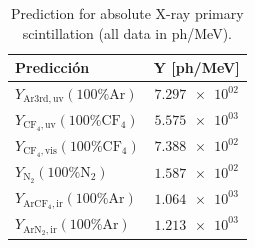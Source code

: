 \begin{table}
\caption{Prediction for absolute X-ray primary scintillation (all data in ph/MeV).}
\label{tab:prediction}
\begin{tabular}{lS}
\toprule
{Predicción} & {Y [ph/MeV]} \\
\midrule
$Y_{\mathrm{Ar3rd,uv}} (100\% \mathrm{Ar})$ & $\num{7.297e+02}$ \\
$Y_{\mathrm{CF_4,uv}} (100\% \mathrm{CF_4})$ & $\num{5.575e+03}$ \\
$Y_{\mathrm{CF_4,vis}} (100\% \mathrm{CF_4})$ & $\num{7.388e+02}$ \\
$Y_{\mathrm{N_2}} (100\% \mathrm{N_2})$ & $\num{1.587e+02}$ \\
$Y_{\mathrm{ArCF_4,ir}} (100\% \mathrm{Ar})$ & $\num{1.064e+03}$ \\
$Y_{\mathrm{ArN_2,ir}} (100\% \mathrm{Ar})$ & $\num{1.213e+03}$ \\
\bottomrule
\end{tabular}
\end{table}

